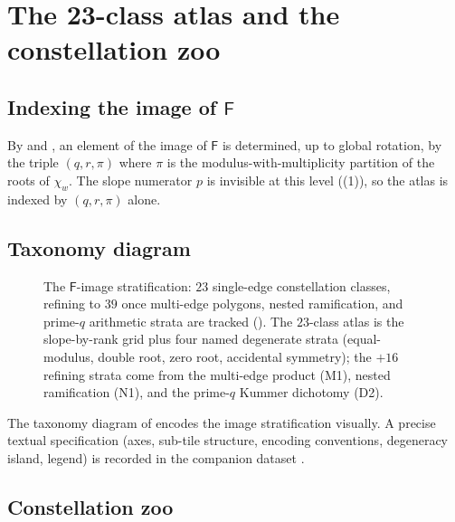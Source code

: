 \documentclass[aip,jmp,preprint,amsmath,amssymb,nofootinbib,floatfix]{revtex4-2}
\theoremstyle{plain}
\theoremstyle{definition}
\theoremstyle{remark}
\newcommand{\Fclass}{\mathsf{F}}
\begin{document}
\section{The 23-class atlas and the constellation zoo}\label{sec:classes}

\subsection{\texorpdfstring{Indexing the image of $\Fclass$}{Indexing the image of F}}\label{ssec:classes-index}

By  and , an element of the image of
$\Fclass$ is determined, up to global rotation, by the triple $(q, r,
\pi)$ where $\pi$ is the modulus-with-multiplicity partition of the roots
of $\chi_w$. The slope numerator $p$ is invisible at this level
((1)), so the atlas is indexed by $(q, r, \pi)$ alone.

\subsection{Taxonomy diagram}\label{ssec:taxonomy}

\begin{figure}[t]
\centering

\caption{The $\Fclass$-image stratification: $23$ single-edge
constellation classes, refining to $39$ once multi-edge polygons,
nested ramification, and prime-$q$ arithmetic strata are tracked
(). The $23$-class atlas is the slope-by-rank
grid plus four named degenerate strata (equal-modulus, double root,
zero root, accidental symmetry); the $+16$ refining strata come from
the multi-edge product (M1), nested ramification (N1), and the
prime-$q$ Kummer dichotomy (D2).}
\label{fig:taxonomy}
\end{figure}

The taxonomy diagram of  encodes the image
stratification visually. A precise textual specification (axes, sub-tile
structure, encoding conventions, degeneracy island, legend) is recorded
in the companion dataset \cite{wkb_dataset_v1}.

\subsection{Constellation zoo}\label{ssec:zoo}
\end{document}

